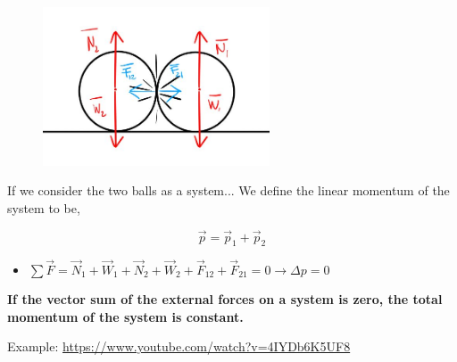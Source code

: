 \documentclass[]{beamer}
\begin{document}
\begin{frame}

    
    \begin{figure}[h!]  
        \includegraphics[width=0.6\textwidth]{images/2.jpg}
    
      \end{figure}
  
      If we consider the two balls as a system...
      \pause
   We define the linear momentum of the system to be,
   
   \begin{equation}
       \vec p=\vec p_1+\vec p_2
   \end{equation}
   \pause
      \begin{itemize}
        \item $\sum \vec F=\vec N_1+\vec W_1+\vec N_2+\vec W_2+\vec F_{12}+\vec F_{21}=0\rightarrow \Delta p=0$
    \end{itemize}
    
    
    
        \end{frame}



\begin{frame}

    \textbf{If the vector sum of the external forces on a system is zero, the total momentum
of the system is constant.}


\vspace{5mm}

Example: \url{https://www.youtube.com/watch?v=4IYDb6K5UF8}
    
        \end{frame}
        




        
\end{document}
